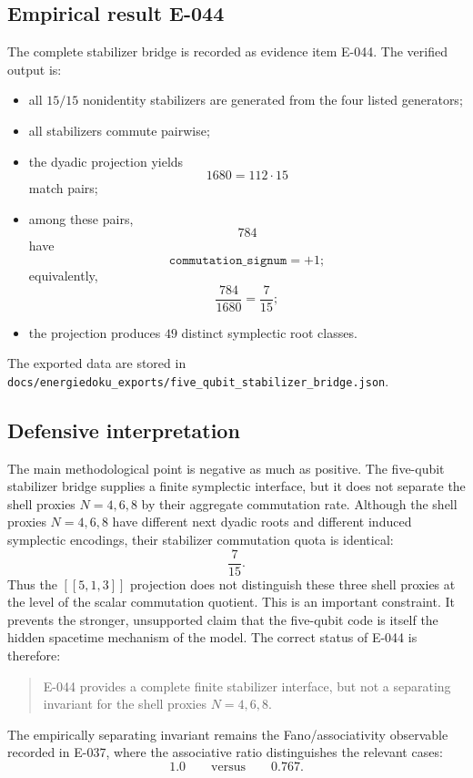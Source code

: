 \documentclass[11pt, lettersize, article]{article}
\theoremstyle{definition}
\theoremstyle{remark}
\begin{document}
\subsection{Empirical result E-044}

The complete stabilizer bridge is recorded as evidence item E-044.
The verified output is:
\begin{itemize}
  \item all $15/15$ nonidentity stabilizers are generated from the four
  listed generators;
  \item all stabilizers commute pairwise;
  \item the dyadic projection yields
  \[
  1680 = 112\cdot 15
  \]
  match pairs;
  \item among these pairs,
  \[
  784
  \]
  have
  \[
  \texttt{commutation\_signum}=+1;
  \]
  equivalently,
  \[
  \frac{784}{1680}=\frac{7}{15};
  \]
  \item the projection produces $49$ distinct symplectic root classes.
\end{itemize}
The exported data are stored in
\texttt{docs/energiedoku\_exports/five\_qubit\_stabilizer\_bridge.json}.

\subsection{Defensive interpretation}

The main methodological point is negative as much as positive.  The
five-qubit stabilizer bridge supplies a finite symplectic interface, but
it does not separate the shell proxies $N=4,6,8$ by their aggregate
commutation rate.
Although the shell proxies $N=4,6,8$ have different next dyadic roots
and different induced symplectic encodings, their stabilizer commutation
quota is identical:
\[
\frac{7}{15}.
\]
Thus the $[[5,1,3]]$ projection does not distinguish these three
shell proxies at the level of the scalar commutation quotient.
This is an important constraint.  It prevents the stronger, unsupported
claim that the five-qubit code is itself the hidden spacetime mechanism
of the model.  The correct status of E-044 is therefore:
\begin{quote}
E-044 provides a complete finite stabilizer interface, but not a
separating invariant for the shell proxies $N=4,6,8$.
\end{quote}
The empirically separating invariant remains the Fano/associativity
observable recorded in E-037, where the associative ratio distinguishes
the relevant cases:
\[
1.0
\qquad\text{versus}\qquad
0.767.
\]
\end{document}
